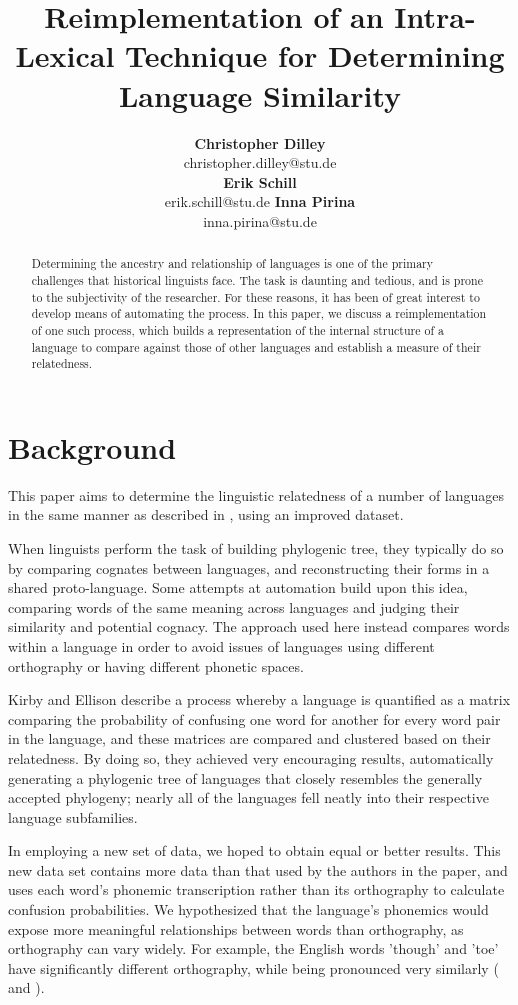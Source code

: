 \documentclass[10pt,a4]{article}
\title{Reimplementation of an Intra-Lexical Technique for Determining Language Similarity}
\author{{\large \bf Christopher Dilley} \\
	 christopher.dilley@stu\texttildelow.de \\\And
	{\large \bf Erik Schill} \\
	erik.schill@stu\texttildelow.de \And
	{\large \bf Inna Pirina} \\
	inna.pirina@stu\texttildelow.de }
\begin{document}
\maketitle


\begin{abstract}
	
	Determining the ancestry and relationship of languages is one of the primary challenges that historical linguists face.  The task is daunting and tedious, and is prone to the subjectivity of the researcher.  For these reasons, it has been of great interest to develop means of automating the process.  In this paper, we discuss a reimplementation of one such process, which builds a representation of the internal structure of a language to compare against those of other languages and establish a measure of their relatedness.
	
\end{abstract}


\section{Background}

This paper aims to determine the linguistic relatedness of a number of languages in the same manner as described in , using an improved dataset.  

When linguists perform the task of building phylogenic tree, they typically do so by comparing cognates between languages, and reconstructing their forms in a shared proto-language.  Some attempts at automation build upon this idea, comparing words of the same meaning across languages and judging their similarity and potential cognacy.  The approach used here instead compares words within a language in order to avoid issues of languages using different orthography or having different phonetic spaces.

Kirby and Ellison describe a process whereby a language is quantified as a matrix comparing the probability of confusing one word for another for every word pair in the language, and these matrices are compared and clustered based on their relatedness.  By doing so, they achieved very encouraging results, automatically generating a phylogenic tree of languages that closely resembles the generally accepted phylogeny; nearly all of the languages fell neatly into their respective language subfamilies.

In employing a new set of data, we hoped to obtain equal or better results.  This new data set contains more data than that used by the authors in the paper, and uses each word's phonemic transcription rather than its orthography to calculate confusion probabilities.  We hypothesized that the language's phonemics would expose more meaningful relationships between words than orthography, as orthography can vary widely.  For example, the English words 'though' and 'toe' have significantly different orthography, while being pronounced very similarly (\textipa{[Do:]} and \textipa{[to:]}).
\end{document}
